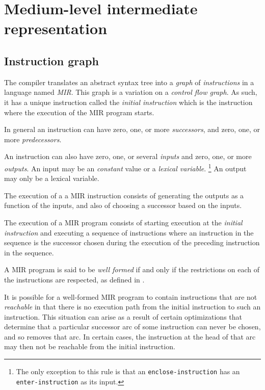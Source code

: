 \chapter{Medium-level intermediate representation}
\label{chap-mir}

\section{Instruction graph}

The compiler translates an abstract syntax tree into a \emph{graph} of
\emph{instructions} in a language named \emph{MIR}.  This graph is a
variation on a \emph{control flow graph}.  As such, it has a unique
instruction called the \emph{initial instruction} which is the
instruction where the execution of the MIR program starts. 

In general an instruction can have zero, one, or more
\emph{successors}, and zero, one, or more \emph{predecessors}.

An instruction can also have zero, one, or several \emph{inputs} and
zero, one, or more \emph{outputs}.  An input may be an \emph{constant}
value or a \emph{lexical variable}.%
\footnote{The only exception to this rule is that an
  \texttt{enclose-instruction} has an \texttt{enter-instruction} as
  its input.}  An output may only be a lexical variable.

The execution of a a MIR instruction consists of generating the
outputs as a function of the inputs, and also of choosing a successor
based on the inputs.

The execution of a MIR program consists of starting execution at the
\emph{initial instruction} and executing a sequence of instructions
where an instruction in the sequence is the successor chosen during
the execution of the preceding instruction in the sequence.

A MIR program is said to be \emph{well formed} if and only if the
restrictions on each of the instructions are respected, as defined in
.

It is possible for a well-formed MIR program to contain instructions
that are not \emph{reachable} in that there is no execution path from
the initial instruction to such an instruction.  This situation can
arise as a result of certain optimizations that determine that a
particular successor arc of some instruction can never be chosen, and
so removes that arc.  In certain cases, the instruction at the head of
that arc may then not be reachable from the initial instruction.  

